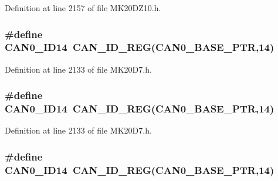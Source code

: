 Definition at line 2157 of file M\+K20\+D\+Z10.\+h.

\subsubsection[{\texorpdfstring{C\+A\+N0\+\_\+\+I\+D14}{CAN0_ID14}}]{\setlength{\rightskip}{0pt plus 5cm}\#define C\+A\+N0\+\_\+\+I\+D14~{\bf C\+A\+N\+\_\+\+I\+D\+\_\+\+R\+EG}({\bf C\+A\+N0\+\_\+\+B\+A\+S\+E\+\_\+\+P\+TR},14)}\hypertarget{group___c_a_n___register___accessor___macros_gac4e9f48083ffefeee04f35217ac158b3}{}\label{group___c_a_n___register___accessor___macros_gac4e9f48083ffefeee04f35217ac158b3}


Definition at line 2133 of file M\+K20\+D7.\+h.

\subsubsection[{\texorpdfstring{C\+A\+N0\+\_\+\+I\+D14}{CAN0_ID14}}]{\setlength{\rightskip}{0pt plus 5cm}\#define C\+A\+N0\+\_\+\+I\+D14~{\bf C\+A\+N\+\_\+\+I\+D\+\_\+\+R\+EG}({\bf C\+A\+N0\+\_\+\+B\+A\+S\+E\+\_\+\+P\+TR},14)}\hypertarget{group___c_a_n___register___accessor___macros_gac4e9f48083ffefeee04f35217ac158b3}{}\label{group___c_a_n___register___accessor___macros_gac4e9f48083ffefeee04f35217ac158b3}


Definition at line 2133 of file M\+K20\+D7.\+h.

\subsubsection[{\texorpdfstring{C\+A\+N0\+\_\+\+I\+D14}{CAN0_ID14}}]{\setlength{\rightskip}{0pt plus 5cm}\#define C\+A\+N0\+\_\+\+I\+D14~{\bf C\+A\+N\+\_\+\+I\+D\+\_\+\+R\+EG}({\bf C\+A\+N0\+\_\+\+B\+A\+S\+E\+\_\+\+P\+TR},14)}\hypertarget{group___c_a_n___register___accessor___macros_gac4e9f48083ffefeee04f35217ac158b3}{}\label{group___c_a_n___register___accessor___macros_gac4e9f48083ffefeee04f35217ac158b3}


